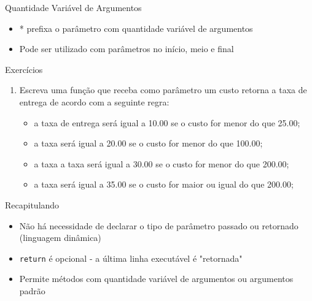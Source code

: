 \begin{frame}[fragile,t]{Quantidade Variável de Argumentos}
  \begin{itemize}
    \item \alert{*} prefixa o parâmetro com quantidade variável de argumentos
  \end{itemize}
  \begin{itemize}
    \item Pode ser utilizado com parâmetros no início, meio e final
  \end{itemize}
  
\end{frame}
\begin{frame}[fragile,t]{Exercícios}
  \begin{enumerate}
    \item Escreva uma função que receba como parâmetro um custo retorna a taxa de entrega
		de acordo com a seguinte regra:
		\begin{itemize}
			\item a taxa de entrega será igual a 10.00 se o custo for menor do que 25.00;
			\item a taxa será igual a 20.00 se o custo for menor do que 100.00;
			\item a taxa a taxa será igual a 30.00 se o custo for menor do que 200.00;
			\item a taxa será igual a 35.00 se o custo for maior ou igual do que 200.00;
		\end{itemize} 
  \end{enumerate}
\end{frame}

\begin{frame}[fragile,t]{Recapitulando}
  \begin{itemize}
    \item \alert{Não há necessidade} de declarar o tipo de parâmetro passado ou retornado (linguagem dinâmica)
    \item \verb!return! é \alert{opcional} - a última linha executável é "retornada"
    \item Permite métodos com \alert{quantidade variável} de argumentos ou argumentos padrão
  \end{itemize}
\end{frame}



